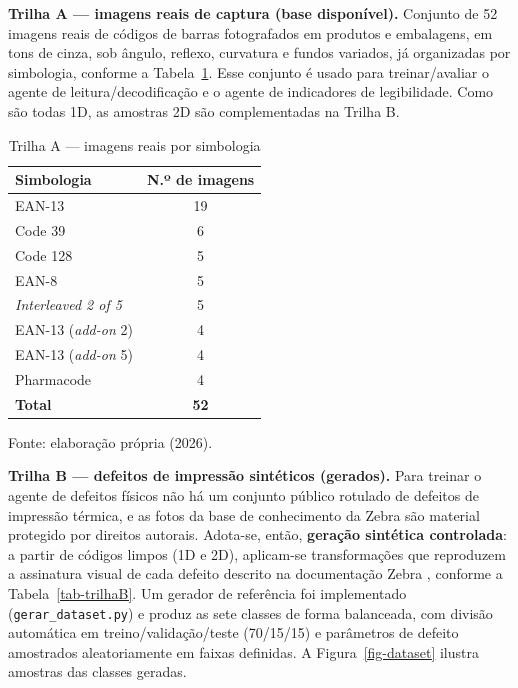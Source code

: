 \documentclass[
	article,			%
	11pt,				%
	oneside,			%
	a4paper,			%
	english,			%
	brazilian,			%
	sumario=tradicional
	]{abntex2}
\begin{document}
\noindent\textbf{Trilha A --- imagens reais de captura (base disponível).}
Conjunto de 52 imagens reais de códigos de barras fotografados em produtos e
embalagens, em tons de cinza, sob ângulo, reflexo, curvatura e fundos variados, já
organizadas por simbologia, conforme a Tabela~\ref{tab-trilhaA}. Esse conjunto é
usado para treinar/avaliar o agente de leitura/decodificação e o agente de
indicadores de legibilidade. Como são todas 1D, as amostras 2D são complementadas
na Trilha B.

\begin{table}[htb]
\centering
\caption{Trilha A --- imagens reais por simbologia}
\label{tab-trilhaA}
\begin{tabular}{@{}lc@{}}
\toprule
\textbf{Simbologia} & \textbf{N.º de imagens}\\
\midrule
EAN-13 & 19\\
Code 39 & 6\\
Code 128 & 5\\
EAN-8 & 5\\
\textit{Interleaved 2 of 5} & 5\\
EAN-13 (\textit{add-on} 2) & 4\\
EAN-13 (\textit{add-on} 5) & 4\\
Pharmacode & 4\\
\midrule
\textbf{Total} & \textbf{52}\\
\bottomrule
\end{tabular}

\vspace{2pt}
{\footnotesize Fonte: elaboração própria (2026).}
\end{table}

\noindent\textbf{Trilha B --- defeitos de impressão sintéticos (gerados).} Para
treinar o agente de defeitos físicos não há um conjunto público rotulado de
defeitos de impressão térmica, e as fotos da base de conhecimento da Zebra são
material protegido por direitos autorais. Adota-se, então, \textbf{geração
sintética controlada}: a partir de códigos limpos (1D e 2D), aplicam-se
transformações que reproduzem a assinatura visual de cada defeito descrito na
documentação Zebra \cite{zebra_printquality}, conforme a Tabela~\ref{tab-trilhaB}.
Um gerador de referência foi implementado (\texttt{gerar\_dataset.py}) e produz as
sete classes de forma balanceada, com divisão automática em treino/validação/teste
(70/15/15) e parâmetros de defeito amostrados aleatoriamente em faixas definidas.
A Figura~\ref{fig-dataset} ilustra amostras das classes geradas.
\end{document}
